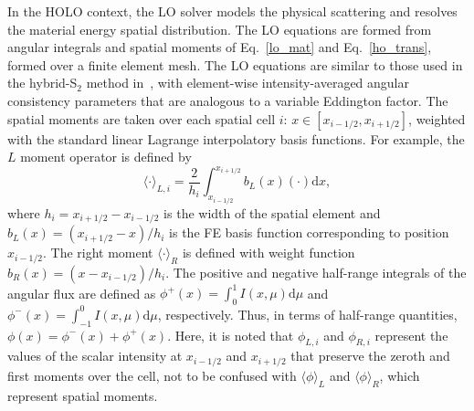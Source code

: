\documentclass{mc2013}
\renewcommand{\d}{\mathrm{d}}
\newcommand{\mom}[1]{\langle #1 \rangle}
\newcommand{\xr}{{x_{i+1/2}}}
\newcommand{\il}{{i-1/2}}
\newcommand{\ir}{{i+1/2}}
\begin{document}
In the HOLO context, the LO solver models the physical scattering and
resolves the material energy spatial distribution.  The LO equations are formed from
angular integrals and spatial moments of
Eq.~\eqref{lo_mat} and Eq.~\eqref{ho_trans}, formed over a finite element mesh. The
LO equations are similar to those used in the
hybrid-S$_2$ method in~\cite{wolters}, with
element-wise intensity-averaged angular consistency parameters that are analogous to a variable
Eddington factor.  The spatial moments are taken over each spatial cell $i$:
$x\in[x_{i-1/2},x_{i+1/2}]$, weighted with the standard linear Lagrange
interpolatory basis functions.  For example, the $L$  moment operator is defined by
\begin{equation}\label{x_mom}
\mom{\cdot}_{L,i} = \frac{2}{h_i} \int_{x_{i-1/2}}^{\xr} b_L(x) (\cdot) \d x,
\end{equation}
where $h_i=x_{i+1/2}-x_{i-1/2}$ is the width of the spatial element and
$b_L(x)=(x_{i+1/2}-x)/h_i$ is the FE basis function corresponding to position
$x_{i-1/2}$.  The right moment $\mom{\cdot}_R$ is defined with weight function $b_R(x)=(x -
x_{i-1/2})/h_i$.  The positive and negative half-range integrals of the angular flux are defined as
$ \phi^+(x) = \int_0^{1} I(x,\mu) \d \mu$ and $ \phi^-(x) = \int_{-1}^{0} I(x,\mu) \d
\mu$, respectively.  Thus, in terms of half-range quantities, $\phi(x) = \phi^-(x) +
\phi ^+(x)$.  Here, it is noted that $\phi_{L,i}$ and $\phi_{R,i}$ represent
the values of the scalar intensity at $x_\il$ and $x_\ir$ that preserve the zeroth
and first moments over the cell, not to be confused with $\mom{\phi}_L$ and
$\mom{\phi}_R$, which
represent spatial moments.
\end{document}
